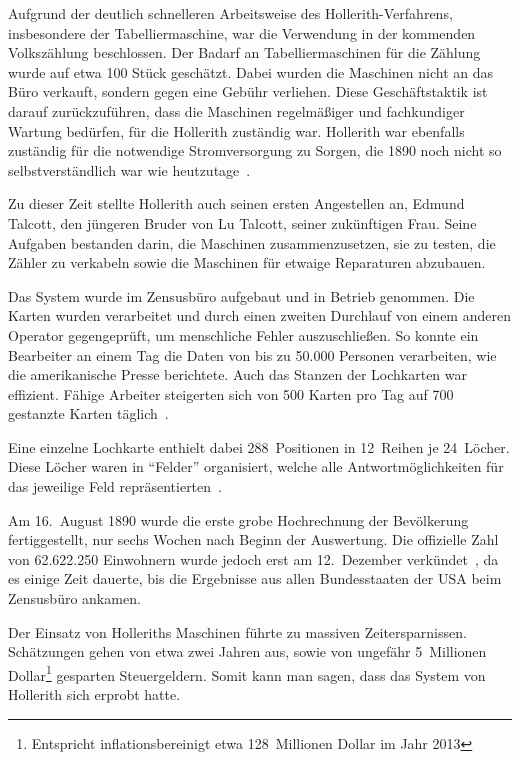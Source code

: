 \documentclass[parskip=half]{scrartcl}
\begin{document}
Aufgrund der deutlich schnelleren Arbeitsweise des Hollerith-Verfahrens,
insbesondere der Tabelliermaschine, war die Verwendung in der kommenden
Volkszählung beschlossen. Der Badarf an Tabelliermaschinen für die Zählung
wurde auf etwa 100 Stück geschätzt. Dabei wurden die Maschinen nicht an das
Büro verkauft, sondern gegen eine Gebühr verliehen. Diese Geschäftstaktik ist
darauf zurückzuführen, dass die Maschinen regelmäßiger und fachkundiger Wartung
bedürfen, für die Hollerith zuständig war. Hollerith war ebenfalls zuständig
für die notwendige Stromversorgung zu Sorgen, die 1890 noch nicht so
selbstverständlich war wie heutzutage~\cite{austrian1982herman}.

Zu dieser Zeit stellte Hollerith auch seinen ersten Angestellen an, Edmund
Talcott, den jüngeren Bruder von Lu Talcott, seiner zukünftigen Frau. Seine
Aufgaben bestanden darin, die Maschinen zusammenzusetzen, sie zu testen, die
Zähler zu verkabeln sowie die Maschinen für etwaige Reparaturen abzubauen.

Das System wurde im Zensusbüro aufgebaut und in Betrieb genommen. Die Karten
wurden verarbeitet und durch einen zweiten Durchlauf von einem anderen Operator
gegengeprüft, um menschliche Fehler auszuschließen. So konnte ein Bearbeiter
an einem Tag die Daten von bis zu 50.000 Personen verarbeiten, wie die
amerikanische Presse berichtete. Auch das Stanzen der Lochkarten war effizient.
Fähige Arbeiter steigerten sich von 500 Karten pro Tag auf 700 gestanzte Karten
täglich~\cite{austrian1982herman}.

Eine einzelne Lochkarte enthielt dabei 288~Positionen in 12~Reihen je
24~Löcher. Diese Löcher waren in \enquote{Felder} organisiert, welche alle
Antwortmöglichkeiten für das jeweilige Feld
repräsentierten~\cite{priestley2010science}.

Am 16.~August 1890 wurde die erste grobe Hochrechnung der Bevölkerung
fertiggestellt, nur sechs Wochen nach Beginn der Auswertung. Die offizielle
Zahl von 62.622.250 Einwohnern wurde jedoch erst am 12.~Dezember
verkündet~\cite{austrian1982herman}, da es einige Zeit dauerte, bis die
Ergebnisse aus allen Bundesstaaten der USA beim Zensusbüro ankamen.

Der Einsatz von Holleriths Maschinen führte zu massiven Zeitersparnissen.
Schätzungen gehen von etwa zwei Jahren aus, sowie von ungefähr 5~Millionen
Dollar\footnote{Entspricht inflationsbereinigt etwa 128~Millionen Dollar im
Jahr 2013} gesparten Steuergeldern. Somit kann man sagen, dass das System von Hollerith
sich erprobt hatte.
\end{document}
